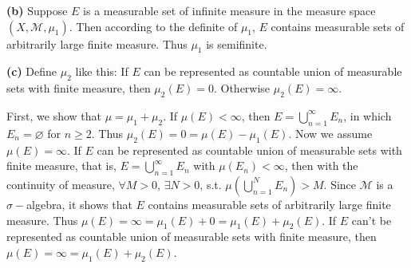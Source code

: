 \documentclass{article}%
\begin{document}
\begin{enumerate}
\textbf{(b)} Suppose $E$ is a measurable set of infinite measure in the measure space $(X, \mathcal{M}, \mu_1)$. Then according to the definite of $\mu_1$, $E$ contains measurable sets of arbitrarily large finite measure. Thus $\mu_{1}$ is semifinite.

\textbf{(c)} Define $\mu_2$ like this: If $E$ can be represented as countable union of measurable sets with finite measure, then $\mu_2(E) = 0$. Otherwise $\mu_2(E) = \infty$.

First, we show that $\mu = \mu_1 + \mu_2$. If $\mu(E) < \infty$, then $E = \bigcup\limits_{n=1}^{\infty}E_n$, in which $E_n = \varnothing$ for $n \ge 2$. Thus $\mu_2(E) = 0 = \mu(E) - \mu_1(E)$. Now we assume $\mu(E) = \infty$. If $E$ can be represented as countable union of measurable sets with finite measure, that is, $E = \bigcup\limits_{n=1}^{\infty}E_n$ with $\mu(E_n) < \infty$, then with the continuity of measure, $\forall M > 0$, $\exists N > 0$, s.t. $\mu\left(\bigcup\limits_{n=1}^{N}E_n\right) > M$. Since $\mathcal{M}$ is a $\sigma-$algebra, it shows that $E$ contains measurable sets of arbitrarily large finite measure. Thus $\mu(E) = \infty = \mu_1(E) + 0 = \mu_1(E) + \mu_2(E)$. If $E$ can't be represented as countable union of measurable sets with finite measure, then $\mu(E) = \infty = \mu_1(E) +\mu_2(E)$.


\end{enumerate}
\end{document}
